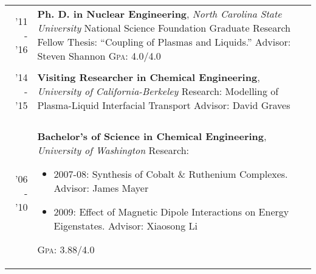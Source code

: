 \documentclass[a4paper,10pt]{article} %
\begin{document}
\begin{table}[h]
\begin{tabularx}{\textwidth}{r>{\raggedright\arraybackslash}X}

  \textsc{'11 - '16} & \textbf{Ph. D. in Nuclear Engineering}, \textit{North Carolina State University}\newline
  National Science Foundation Graduate Research Fellow\newline
  Thesis: ``Coupling of Plasmas and Liquids.''\newline
  Advisor: Steven Shannon\newline
  \textsc{Gpa}: 4.0/4.0\\
&\\


  \textsc{'14 - '15} & \textbf{Visiting Researcher in Chemical Engineering}, \textit{University of California-Berkeley}\newline
  Research: Modelling of Plasma-Liquid Interfacial Transport\newline
  Advisor: David Graves\\
&\\


  \textsc{'06 - '10} & \textbf{Bachelor's of Science in Chemical Engineering}, \textit{University of Washington}\newline
  Research:
  \begin{itemize}
  \item 2007-08: Synthesis of Cobalt \& Ruthenium Complexes. Advisor: James Mayer
  \item 2009: Effect of Magnetic Dipole Interactions on Energy Eigenstates. Advisor: Xiaosong Li
  \end{itemize}
  \textsc{Gpa}: 3.88/4.0\\

\end{tabularx}
\end{table}



\pagebreak

\end{document}
